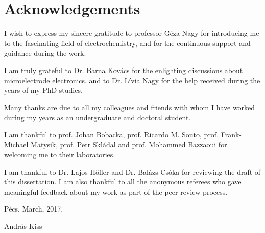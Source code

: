 \chapter*{Acknowledgements}
I wish to express my sincere gratitude to professor Géza Nagy for introducing me to the fascinating field of electrochemistry, and for the continuous support and guidance during the work. 

\vspace{5mm}

I am truly grateful to Dr. Barna Kovács for the enlighting discussions about microelectrode electronics. and to Dr. Lívia Nagy for the help received during the years of my PhD studies.

\vspace{5mm}

Many thanks are due to all my colleagues and friends with whom I have worked during my years as an undergraduate and doctoral student.

\vspace{5mm}

I am thankful to prof. Johan Bobacka, prof. Ricardo M. Souto, prof. Frank-Michael Matysik, prof. Petr Skládal and prof. Mohammed Bazzaoui for welcoming me to their laboratories.

\vspace{5mm}

I am thankful to Dr. Lajos Höfler and Dr. Balázs Csóka for reviewing the draft of this dissertation. I am also thankful to all the anonymous referees who gave meaningful feedback about my work as part of the peer review process.

\vspace{20mm}

Pécs, March, 2017.

\vspace{5mm}

András Kiss
